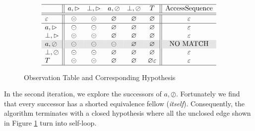 \documentclass[conference, a4paper]{IEEEtran}
\newcommand{\rblock}[0]{\circleddash}
\newcommand{\rread}[0]{\rhd}
\newcommand{\rnoread}[0]{\oslash}
\newcommand{\rempty}[0]{\varnothing}
\begin{document}
\begin{figure}[ht]
  \begin{center}
    \begin{displaymath}
      \begin{array}{l||ccccc||c}
        \hline
        & a,\rread & \bot,\rread & a,\rnoread & \bot,\rnoread & T & \mbox{AccessSequence}\\
        \hline\hline
        \varepsilon & \rblock & \rblock & \rempty & \rempty & \rempty & \varepsilon\\
        \hline
        a,\rread & \rblock & \rblock & \rempty & \rempty & \rempty & \varepsilon\\
        \bot,\rread & \rblock & \rblock & \rempty & \rempty & \rempty & \varepsilon \\
        \rowcolor[gray]{.9}
        a,\rnoread & \rblock & \rblock & \rblock & \rempty & \rempty & \mbox{NO MATCH}\\
        \bot,\rnoread & \rblock & \rblock & \rempty & \rempty & \rempty & \varepsilon \\
        T & \rblock & \rblock & \rempty & \rempty & \rempty \varepsilon & \varepsilon \\
        \hline
      \end{array}
    \end{displaymath}
  \end{center}
  \caption{Observation Table and Corresponding Hypothesis}
  \label{fig:hypo}
\end{figure}

In the second iteration, we explore the successors of $a,\rnoread$. Fortunately we find that every
successor has a shorted equivalence fellow (\emph{itself}). Consequently, the algorithm terminates
with a closed hypothesis where all the unclosed edge shown in Figure \ref{fig:hypo} turn into
self-loop.
\end{document}
